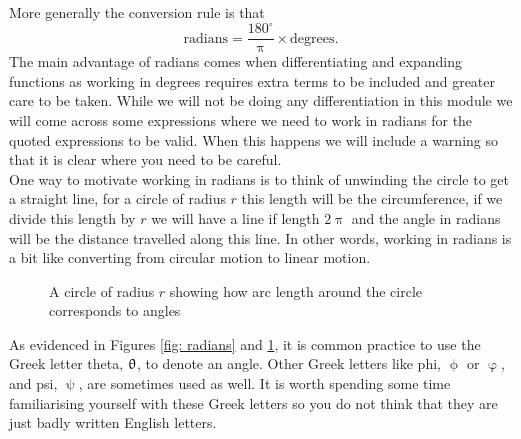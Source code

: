 More generally the conversion rule is that
\begin{equation*}
\text{radians} = \frac{180^{\circ}}{\uppi}\times \text{degrees}.
\end{equation*}
The main advantage of radians comes when differentiating and expanding functions as working in degrees requires extra terms to be included and greater care to be taken. While we will not be doing any differentiation in this module we will come across some expressions where we need to work in radians for the quoted expressions to be valid. When this happens we will include a warning so that it is clear where you need to be careful.\\

One way to motivate working in radians is to think of unwinding the circle to get a straight line, for a circle of radius $r$ this length will be the circumference, if we divide this length by $r$ we will have a line if length $2\uppi$ and the angle in radians will be the distance travelled along this line. In other words, working in radians is a bit like converting from circular motion to linear motion.

\begin{figure}[ht]
    \centering
    \caption{A circle of radius $r$ showing how arc length around the circle corresponds to angles}
        \label{fig: radians 2}
\end{figure}

As evidenced in Figures \ref{fig: radians} and \ref{fig: radians 2}, it is common practice to use the Greek letter theta, $\uptheta$, to denote an angle. Other Greek letters like phi, $\upphi$ or $\upvarphi$, and psi, $\uppsi$, are sometimes used as well. It is worth spending some time familiarising yourself with these Greek letters so you do not think that they are just badly written English letters.

